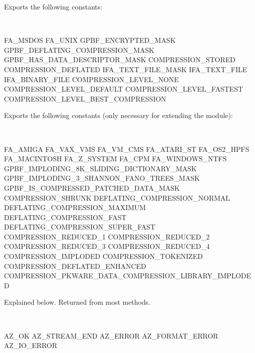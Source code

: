 \documentclass[]{article}
\begin{document}

\begin{description}
\itemsep1pt\parskip0pt
\item[:CONSTANTS]
Exports the following constants:

~

FA\_MSDOS FA\_UNIX GPBF\_ENCRYPTED\_MASK
GPBF\_DEFLATING\_COMPRESSION\_MASK GPBF\_HAS\_DATA\_DESCRIPTOR\_MASK
COMPRESSION\_STORED COMPRESSION\_DEFLATED IFA\_TEXT\_FILE\_MASK
IFA\_TEXT\_FILE IFA\_BINARY\_FILE COMPRESSION\_LEVEL\_NONE
COMPRESSION\_LEVEL\_DEFAULT COMPRESSION\_LEVEL\_FASTEST
COMPRESSION\_LEVEL\_BEST\_COMPRESSION
\end{description}

\begin{description}
\itemsep1pt\parskip0pt
\item[:MISC\_CONSTANTS]
Exports the following constants (only necessary for extending the
module):

~

FA\_AMIGA FA\_VAX\_VMS FA\_VM\_CMS FA\_ATARI\_ST FA\_OS2\_HPFS
FA\_MACINTOSH FA\_Z\_SYSTEM FA\_CPM FA\_WINDOWS\_NTFS
GPBF\_IMPLODING\_8K\_SLIDING\_DICTIONARY\_MASK
GPBF\_IMPLODING\_3\_SHANNON\_FANO\_TREES\_MASK
GPBF\_IS\_COMPRESSED\_PATCHED\_DATA\_MASK COMPRESSION\_SHRUNK
DEFLATING\_COMPRESSION\_NORMAL DEFLATING\_COMPRESSION\_MAXIMUM
DEFLATING\_COMPRESSION\_FAST DEFLATING\_COMPRESSION\_SUPER\_FAST
COMPRESSION\_REDUCED\_1 COMPRESSION\_REDUCED\_2 COMPRESSION\_REDUCED\_3
COMPRESSION\_REDUCED\_4 COMPRESSION\_IMPLODED COMPRESSION\_TOKENIZED
COMPRESSION\_DEFLATED\_ENHANCED
COMPRESSION\_PKWARE\_DATA\_COMPRESSION\_LIBRARY\_IMPLODED
\end{description}

\begin{description}
\itemsep1pt\parskip0pt
\item[:ERROR\_CODES]
Explained below. Returned from most methods.

~

AZ\_OK AZ\_STREAM\_END AZ\_ERROR AZ\_FORMAT\_ERROR AZ\_IO\_ERROR
\end{description}

\end{document}

